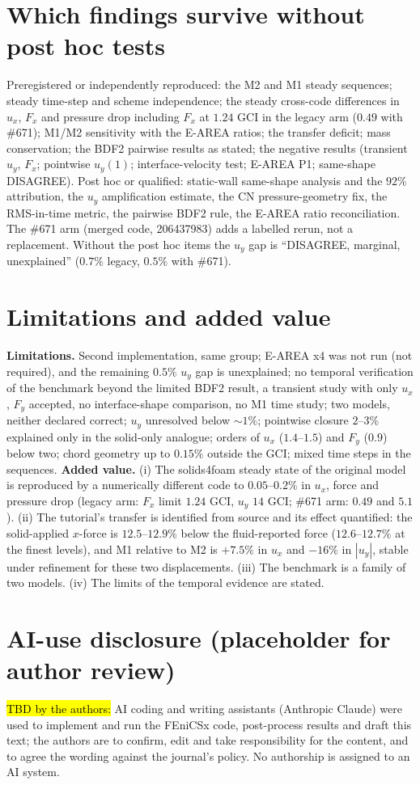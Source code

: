 \documentclass[sn-mathphys,Numbered]{sn-jnl}
\begin{document}
\section{Which findings survive without post hoc tests}
Preregistered or independently reproduced: the M2 and M1 steady sequences; steady time-step and scheme independence; the steady cross-code differences in $u_x$, $F_x$ and pressure drop including $F_x$ at $1.24$ GCI in the legacy arm ($0.49$ with \#671); M1/M2 sensitivity with the E-AREA ratios; the transfer deficit; mass conservation; the BDF2 pairwise results as stated; the negative results (transient $u_y$, $F_x$; pointwise $u_y(1)$; interface-velocity test; E-AREA P1; same-shape DISAGREE).
Post hoc or qualified: static-wall same-shape analysis and the $92\%$ attribution, the $u_y$ amplification estimate, the CN pressure-geometry fix, the RMS-in-time metric, the pairwise BDF2 rule, the E-AREA ratio reconciliation.
The \#671 arm (merged code, 206437983) adds a labelled rerun, not a replacement. Without the post hoc items the $u_y$ gap is ``DISAGREE, marginal, unexplained'' ($0.7\%$ legacy, $0.5\%$ with \#671).

\section{Limitations and added value}
\textbf{Limitations.} Second implementation, same group; E-AREA x4 was not run (not required), and the remaining $0.5\%$ $u_y$ gap is unexplained; no temporal verification of the benchmark beyond the limited BDF2 result, a transient study with only $u_x$, $F_y$ accepted, no interface-shape comparison, no M1 time study; two models, neither declared correct; $u_y$ unresolved below $\sim1\%$; pointwise closure $2$--$3\%$ explained only in the solid-only analogue; orders of $u_x$ ($1.4$--$1.5$) and $F_y$ ($0.9$) below two; chord geometry up to $0.15\%$ outside the GCI; mixed time steps in the sequences.
\textbf{Added value.} (i) The solids4foam steady state of the original model is reproduced by a numerically different code to $0.05$--$0.2\%$ in $u_x$, force and pressure drop (legacy arm: $F_x$ limit $1.24$ GCI, $u_y$ $14$ GCI; \#671 arm: $0.49$ and $5.1$). (ii) The tutorial's transfer is identified from source and its effect quantified: the solid-applied $x$-force is $12.5$--$12.9\%$ below the fluid-reported force ($12.6$--$12.7\%$ at the finest levels), and M1 relative to M2 is $+7.5\%$ in $u_x$ and $-16\%$ in $|u_y|$, stable under refinement for these two displacements. (iii) The benchmark is a family of two models. (iv) The limits of the temporal evidence are stated.

\section*{AI-use disclosure (placeholder for author review)}
\hl{TBD by the authors:} AI coding and writing assistants (Anthropic Claude) were used to implement and run the FEniCSx code, post-process results and draft this text; the authors are to confirm, edit and take responsibility for the content, and to agree the wording against the journal's policy. No authorship is assigned to an AI system.


\end{document}
